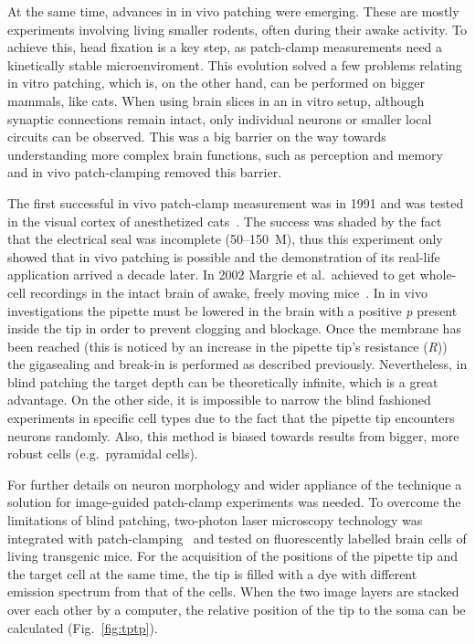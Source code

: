 \documentclass[12pt,a4paper]{report}
\begin{document}
At the same time, advances in in vivo patching were emerging. These are mostly experiments involving living smaller rodents, often during their awake activity. To achieve this, head fixation is a key step, as patch-clamp measurements need a kinetically stable microenviroment. This evolution solved a few problems relating in vitro patching, which is, on the other hand, can be performed on bigger mammals, like cats. When using brain slices in an in vitro setup, although synaptic connections remain intact, only individual neurons or smaller local circuits can be observed. This was a big barrier on the way towards understanding more complex brain functions, such as perception and memory and in vivo patch-clamping removed this barrier.\par
The first successful in vivo patch-clamp measurement was in 1991 and was tested in the visual cortex of anesthetized cats~\cite{pel1991}. The success was shaded by the fact that the electrical seal was incomplete (50--150~M\textOmega), thus this experiment only showed that in vivo patching is possible and the demonstration of its real-life application arrived a decade later. In 2002 Margrie et al.\ achieved to get whole-cell recordings in the intact brain of awake, freely moving mice~\cite{margrie2002}. In in vivo investigations the pipette must be lowered in the brain with a positive \textit{p} present inside the tip in order to prevent clogging and blockage. Once the membrane has been reached (this is noticed by an increase in the pipette tip's resistance (\textit{R})) the gigasealing and break-in is performed as described previously. Nevertheless, in blind patching the target depth can be theoretically infinite, which is a great advantage. On the other side, it is impossible to narrow the blind fashioned experiments in specific cell types due to the fact that the pipette tip encounters neurons randomly. Also, this method is biased towards results from bigger, more robust cells (e.g.\ pyramidal cells).\par
For further details on neuron morphology and wider appliance of the technique a solution for image-guided patch-clamp experiments was needed. To overcome the limitations of blind patching, two-photon laser microscopy technology was integrated with patch-clamping~\cite{margrie2003} and tested on fluorescently labelled brain cells of living transgenic mice. For the acquisition of the positions of the pipette tip and the target cell at the same time, the tip is filled with a dye with different emission spectrum from that of the cells. When the two image layers are stacked over each other by a computer, the relative position of the tip to the soma can be calculated (Fig.~\ref{fig:tptp}).
\end{document}
